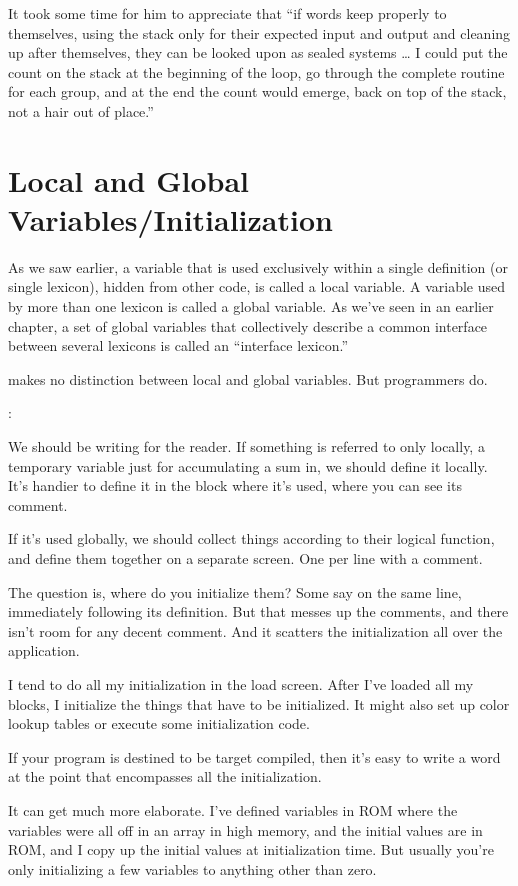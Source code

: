 It took some time for him to appreciate that ``if words keep properly
to themselves, using the stack only for their expected input and output
and cleaning up after themselves, they can be looked upon as sealed
systems \dots{} I could put the count on the stack at the beginning of the
loop, go through the complete routine for each group, and at the end the
count would emerge, back on top of the stack, not a hair out of place.''

\section{Local and Global Variables/Initialization}

As we saw earlier, a variable that is used exclusively within a single
definition (or single lexicon), hidden from other code, is called a local
variable. A variable used by more than one lexicon is called a global
variable. As we've seen in an earlier chapter, a set of global variables that
collectively describe a common interface between several lexicons is
called an ``interface lexicon.''

\Forth{} makes no distinction between local and global variables.
But \Forth{} programmers do.

\begin{interview}
:

\begin{tfquot}
We should be writing for the reader. If something is referred to only locally,
a temporary variable just for accumulating a sum in, we should define it
locally. It's handier to define it in the block where it's used, where you can
see its comment.

If it's used globally, we should collect things according to their logical
function, and define them together on a separate screen. One per line with a
comment.

The question is, where do you initialize them? Some say on the same line,
immediately following its definition. But that messes up the comments,
and there isn't room for any decent comment. And it scatters the
initialization all over the application.

I tend to do all my initialization in the load screen. After I've loaded all my
blocks, I initialize the things that have to be initialized. It might also set
up color lookup tables or execute some initialization code.

If your program is destined to be target compiled, then it's easy to write a
word at the point that encompasses all the initialization.

It can get much more elaborate. I've defined variables in ROM where the
variables were all off in an array in high memory, and the initial values are
in ROM, and I copy up the initial values at initialization time. But usually
you're only initializing a few variables to anything other than zero.
\end{tfquot}
\end{interview}

